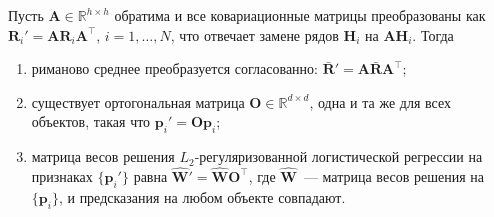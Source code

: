 \begin{proposition}\label{prop:cls_affine}
Пусть $\mathbf{A} \in \mathbb{R}^{h \times h}$ обратима и все ковариационные матрицы преобразованы как $\mathbf{R}_i' = \mathbf{A} \mathbf{R}_i \mathbf{A}^{\top}$, $i = 1, \ldots, N$, что отвечает замене рядов $\mathbf{H}_i$ на $\mathbf{A}\mathbf{H}_i$. Тогда
\begin{enumerate}
    \item[(а)] риманово среднее преобразуется согласованно: $\bar{\mathbf{R}}' = \mathbf{A} \bar{\mathbf{R}} \mathbf{A}^{\top}$;
    \item[(б)] существует ортогональная матрица $\mathbf{O} \in \mathbb{R}^{d \times d}$, одна и та же для всех объектов, такая что $\mathbf{p}_i' = \mathbf{O} \mathbf{p}_i$;
    \item[(в)] матрица весов решения $L_2$-регуляризованной логистической регрессии на признаках $\{\mathbf{p}_i'\}$ равна $\hat{\mathbf{W}}' = \hat{\mathbf{W}} \mathbf{O}^{\top}$, где $\hat{\mathbf{W}}$~--- матрица весов решения на $\{\mathbf{p}_i\}$, и предсказания на любом объекте совпадают.
\end{enumerate}
\end{proposition}
